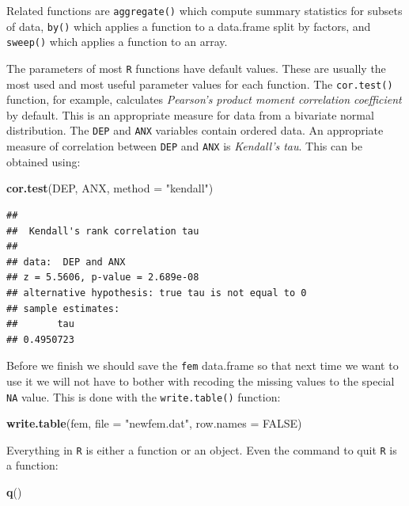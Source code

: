 \documentclass[]{book}
\newenvironment{Shaded}{\begin{snugshade}}{\end{snugshade}}
\newcommand{\KeywordTok}[1]{\textcolor[rgb]{0.13,0.29,0.53}{\textbf{#1}}}
\newcommand{\DataTypeTok}[1]{\textcolor[rgb]{0.13,0.29,0.53}{#1}}
\newcommand{\StringTok}[1]{\textcolor[rgb]{0.31,0.60,0.02}{#1}}
\newcommand{\OtherTok}[1]{\textcolor[rgb]{0.56,0.35,0.01}{#1}}
\newcommand{\NormalTok}[1]{#1}
\theoremstyle{definition}
\theoremstyle{definition}
\theoremstyle{definition}
\theoremstyle{remark}
\begin{document}
Related functions are \texttt{aggregate()} which compute summary
statistics for subsets of data, \texttt{by()} which applies a function
to a data.frame split by factors, and \texttt{sweep()} which applies a
function to an array.

The parameters of most \texttt{R} functions have default values. These
are usually the most used and most useful parameter values for each
function. The \texttt{cor.test()} function, for example, calculates
\emph{Pearson's product moment correlation coefficient} by default. This
is an appropriate measure for data from a bivariate normal distribution.
The \texttt{DEP} and \texttt{ANX} variables contain ordered data. An
appropriate measure of correlation between \texttt{DEP} and \texttt{ANX}
is \emph{Kendall's tau}. This can be obtained using:

\begin{Shaded}
\begin{Highlighting}[]
\KeywordTok{cor.test}\NormalTok{(DEP, ANX, }\DataTypeTok{method =} \StringTok{"kendall"}\NormalTok{)}
\end{Highlighting}
\end{Shaded}

\begin{verbatim}
## 
##  Kendall's rank correlation tau
## 
## data:  DEP and ANX
## z = 5.5606, p-value = 2.689e-08
## alternative hypothesis: true tau is not equal to 0
## sample estimates:
##       tau 
## 0.4950723
\end{verbatim}

Before we finish we should save the \texttt{fem} data.frame so that next
time we want to use it we will not have to bother with recoding the
missing values to the special \texttt{NA} value. This is done with the
\texttt{write.table()} function:

\begin{Shaded}
\begin{Highlighting}[]
\KeywordTok{write.table}\NormalTok{(fem, }\DataTypeTok{file =} \StringTok{"newfem.dat"}\NormalTok{, }\DataTypeTok{row.names =} \OtherTok{FALSE}\NormalTok{)}
\end{Highlighting}
\end{Shaded}

Everything in \texttt{R} is either a function or an object. Even the
command to quit \texttt{R} is a function:

\begin{Shaded}
\begin{Highlighting}[]
\KeywordTok{q}\NormalTok{()}
\end{Highlighting}
\end{Shaded}
\end{document}
